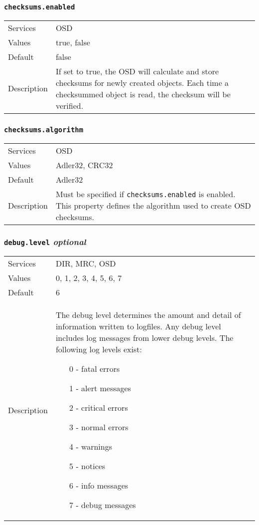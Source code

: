\documentclass[a4paper,10pt]{book}
\begin{document}
\subsubsection{\texttt{checksums.enabled}}
\begin{tabular}{lp{10cm}}
 Services & OSD\\
 Values   & true, false \\
 Default  & false \\
 Description & If set to true, the OSD will calculate and store checksums for newly created objects. Each time a checksummed object is read, the checksum will be verified.
\end{tabular}

\subsubsection{\texttt{checksums.algorithm}}
\begin{tabular}{lp{10cm}}
 Services & OSD\\
 Values   & Adler32, CRC32 \\
 Default  & Adler32 \\
 Description & Must be specified if \texttt{checksums.enabled} is enabled. This property defines the algorithm used to create OSD checksums.
\end{tabular}

\subsubsection{\texttt{debug.level} \textit{optional}}
\begin{tabular}{lp{10cm}}
 Services & DIR, MRC, OSD\\
 Values   & 0, 1, 2, 3, 4, 5, 6, 7 \\
 Default  & 6 \\
 Description & The debug level determines the amount and detail of information written to logfiles. Any debug level includes log messages from lower debug levels. The following log levels exist:
\begin{enumerate}
 \item[0 -] fatal errors
 \item[1 -] alert messages
 \item[2 -] critical errors
 \item[3 -] normal errors
 \item[4 -] warnings
 \item[5 -] notices
 \item[6 -] info messages
 \item[7 -] debug messages
\end{enumerate}
\end{tabular}
\end{document}
